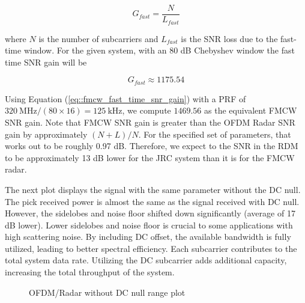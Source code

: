\documentclass[conference]{IEEEtran}
\begin{document}
\begin{equation*}
	G_{fast} = \frac{N}{L_{fast}}
\end{equation*}

where $N$ is the number of subcarriers and $L_{fast}$ is the SNR loss due to the fast-time window. For the given system, with an 80 dB Chebyshev window the fast time SNR gain will be

\begin{equation*}
	G_{fast} \approx 1175.54
\end{equation*}

Using Equation (\ref{eq::fmcw_fast_time_snr_gain}) with a PRF of $320\ \text{MHz}/(80 \times 16) = 125\ \text{kHz}$, we compute $1469.56$ as the equivalent FMCW SNR gain. Note that FMCW SNR gain is greater than the OFDM Radar SNR gain by approximately $(N + L)/N$. For the specified set of parameters, that works out to be roughly 0.97 dB. Therefore, we expect to the SNR in the RDM to be approximately 13 dB lower for the JRC system than it is for the FMCW radar.

\iffalse
The next plot displays the signal with the same parameter without the DC null. The pick received power is almost the same as the signal received with DC null. However, the sidelobes and noise floor shifted down significantly (average of 17 dB lower). Lower sidelobes and noise floor is crucial to some applications with high scattering noise. By including DC offset, the available bandwidth is fully utilized, leading to better spectral efficiency. Each subcarrier contributes to the total system data rate. Utilizing the DC subcarrier adds additional capacity, increasing the total throughput of the system.

\begin{figure}[H]
\centering
{}
\caption{OFDM/Radar without DC null range plot}
\end{figure}
\end{document}
